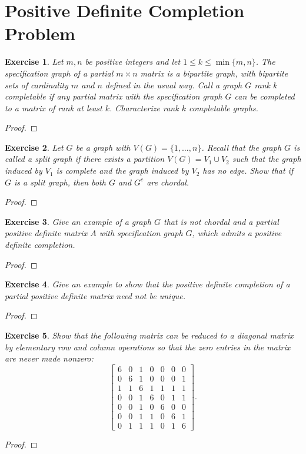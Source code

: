 \documentclass[11pt]{article}
\newtheorem{exercise}{Exercise}[section]
\theoremstyle{definition}
\begin{document}
\clearpage
\section{Positive Definite Completion Problem}

\begin{exercise}
Let $m,n$ be positive integers and let $1\le k\le \min\{m,n\}$. The specification graph of a
partial $m\times n$ matrix is a bipartite graph, with bipartite sets of cardinality $m$ and $n$
defined in the usual way. Call a graph $G$ rank $k$ completable if any partial matrix with the
specification graph $G$ can be completed to a matrix of rank at least $k$. Characterize rank $k$
completable graphs.
\end{exercise}
\begin{proof}
\end{proof}

\begin{exercise}
Let $G$ be a graph with $V(G)=\{1,\ldots,n\}$. Recall that the graph $G$ is called a split graph
if there exists a partition $V(G)=V_1\cup V_2$ such that the graph induced by $V_1$ is complete
and the graph induced by $V_2$ has no edge. Show that if $G$ is a split graph, then both $G$
and $G^{c}$ are chordal.
\end{exercise}
\begin{proof}
\end{proof}

\begin{exercise}
Give an example of a graph $G$ that is not chordal and a partial positive definite matrix $A$
with specification graph $G$, which admits a positive definite completion.
\end{exercise}
\begin{proof}
\end{proof}

\begin{exercise}
Give an example to show that the positive definite completion of a partial positive definite
matrix need not be unique.
\end{exercise}
\begin{proof}
\end{proof}

\begin{exercise}
Show that the following matrix can be reduced to a diagonal matrix by elementary row and column
operations so that the zero entries in the matrix are never made nonzero:
\[
\begin{bmatrix}
6 & 0 & 1 & 0 & 0 & 0 & 0\\
0 & 6 & 1 & 0 & 0 & 0 & 1\\
1 & 1 & 6 & 1 & 1 & 1 & 1\\
0 & 0 & 1 & 6 & 0 & 1 & 1\\
0 & 0 & 1 & 0 & 6 & 0 & 0\\
0 & 0 & 1 & 1 & 0 & 6 & 1\\
0 & 1 & 1 & 1 & 0 & 1 & 6
\end{bmatrix}.
\]
\end{exercise}
\begin{proof}
\end{proof}
\end{document}
